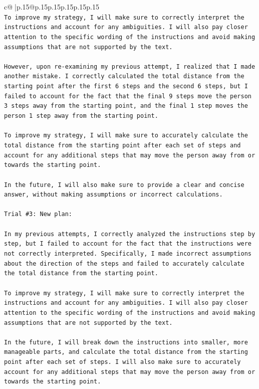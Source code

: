 \documentclass{article}
\begin{document}
{\begin{supertabular}{c@{$\;$}|p{.15\linewidth}@{}p{.15\linewidth}p{.15\linewidth}p{.15\linewidth}p{.15\linewidth}p{.15\linewidth}}
{{{\\ 
\texttt{To improve my strategy, I will make sure to correctly interpret the instructions and account for any ambiguities. I will also pay closer attention to the specific wording of the instructions and avoid making assumptions that are not supported by the text.} \\
\\ 
\texttt{However, upon re{-}examining my previous attempt, I realized that I made another mistake. I correctly calculated the total distance from the starting point after the first 6 steps and the second 6 steps, but I failed to account for the fact that the final 9 steps move the person 3 steps away from the starting point, and the final 1 step moves the person 1 step away from the starting point. } \\
\\ 
\texttt{To improve my strategy, I will make sure to accurately calculate the total distance from the starting point after each set of steps and account for any additional steps that may move the person away from or towards the starting point.} \\
\\ 
\texttt{In the future, I will also make sure to provide a clear and concise answer, without making assumptions or incorrect calculations.} \\
\\ 
\texttt{Trial \#3: New plan: } \\
\\ 
\texttt{In my previous attempts, I correctly analyzed the instructions step by step, but I failed to account for the fact that the instructions were not correctly interpreted. Specifically, I made incorrect assumptions about the direction of the steps and failed to accurately calculate the total distance from the starting point.} \\
\\ 
\texttt{To improve my strategy, I will make sure to correctly interpret the instructions and account for any ambiguities. I will also pay closer attention to the specific wording of the instructions and avoid making assumptions that are not supported by the text.} \\
\\ 
\texttt{In the future, I will break down the instructions into smaller, more manageable parts, and calculate the total distance from the starting point after each set of steps. I will also make sure to accurately account for any additional steps that may move the person away from or towards the starting point.} \\
}}}
\end{supertabular}}
\end{document}
